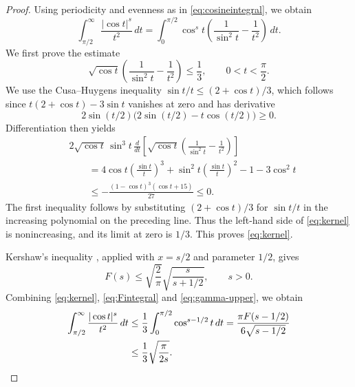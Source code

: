 \documentclass[a4paper,twoside,11pt,reqno]{amsart}
\theoremstyle{definition}
\theoremstyle{remark}
\newcommand{\1}{\mathbbm{1}}
\begin{document}
\begin{proof}
Using periodicity and evenness as in \eqref{eq:cosineintegral}, we obtain
\[
 \int_{\pi/2}^\infty\frac{|\cos t|^s}{t^2}\,dt
 =\int_0^{\pi/2}\cos^s t\left(\frac1{\sin^2t}-\frac1{t^2}\right)\,dt.
\]
We first prove the estimate
\begin{equation}\label{eq:kernel}
 \sqrt{\cos t}\left(\frac1{\sin^2t}-\frac1{t^2}\right)\le\frac13,
 \qquad 0<t<\frac\pi2.
\end{equation}
We use the Cusa--Huygens inequality $\sin t/t\le(2+\cos t)/3$, which follows since $t(2+\cos t)-3\sin t$ vanishes at zero and has derivative
\[
 2\sin(t/2)\bigl(2\sin(t/2)-t\cos(t/2)\bigr)\ge0.
\]
Differentiation then yields
\begin{align*}
 &2\sqrt{\cos t}\,\sin^3t\,\frac{d}{dt}
    \left[\sqrt{\cos t}\left(\frac1{\sin^2t}-\frac1{t^2}\right)\right]\\
 &\qquad=4\cos t\left(\frac{\sin t}{t}\right)^3
       +\sin^2t\left(\frac{\sin t}{t}\right)^2-1-3\cos^2t\\
 &\qquad\le-\frac{(1-\cos t)^3(\cos t+15)}{27}\le0.
\end{align*}
The first inequality follows by substituting $(2+\cos t)/3$ for $\sin t/t$ in the increasing polynomial on the preceding line. Thus the left-hand side of \eqref{eq:kernel} is nonincreasing, and its limit at zero is $1/3$. This proves \eqref{eq:kernel}.

Kershaw's inequality \cite[(1.3)]{Ker83}, applied with $x=s/2$ and parameter $1/2$, gives
\begin{equation}\label{eq:gamma-upper}
 F(s)\le\sqrt{\frac2\pi}\sqrt{\frac{s}{s+1/2}},\qquad s>0.
\end{equation}
Combining \eqref{eq:kernel}, \eqref{eq:Fintegral} and \eqref{eq:gamma-upper}, we obtain
\begin{align*}
 \int_{\pi/2}^\infty\frac{|\cos t|^s}{t^2}\,dt
 &\le\frac13\int_0^{\pi/2}\cos^{s-1/2}t\,dt
 =\frac{\pi F(s-1/2)}{6\sqrt{s-1/2}}\\
 &\le\frac13\sqrt{\frac\pi{2s}}.\qedhere
\end{align*}
\end{proof}
\end{document}
